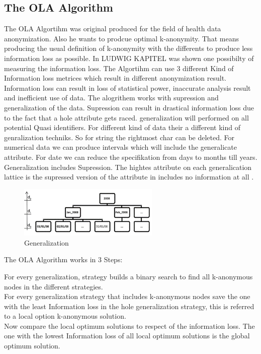\documentclass{llncs}
\begin{document}
\subsection{The OLA Algorithm }

The OLA Algortihm was original produced for the field of health data anonymization. Also he wants to prodcue optimal k-anonymity. That means producing the usual definition of k-anonymity with the differents to produce less information loss as possible. In LUDWIG KAPITEL was shown one possibilty of measuring the information loss. 
The Algortihm can use 3 different Kind of Information loss metrices which result in different anonymization result. Information loss can result in loss of statistical power, inaccurate analysis result and inefficient use of data.  
The alogrithem works with supression and generalization of the data. Supression can result in drastical information loss due to the fact that a hole attribute gets raced.  generalization will performed on all potential Quasi identifiers.
 For different kind of data their a different kind of genralization techniks. So for string the rightmost char can be deleted. For numerical data we can produce intervals which will include the generalicate attribute. For date we can reduce the specifikation from days to months till years. Generalization includes Supression. The hightes attribute on each generalication lattice is the supressed version of the attribute in includes no information at all \cite{el2009globally}. 


\begin{figure}
	\centering
	\includegraphics[width=0.6\textwidth]{general1.png}
	\caption{Generalization}%
	\label{Generalization}
\end{figure}

\begin{algorithm}[H]
\caption{The OLA Algorithm works in 3 Steps:}
{
 For every generalization, strategy builds a binary search to find all k-anonymous nodes in the different strategies.\\
For every generalization strategy that includes k-anonymous nodes save the one with the least Information loss in the hole generalization strategy, this is referred to a local option k-anonymous solution.\\
Now compare the local optimum solutions to respect of the information loss. The one with the lowest Information loss of all local optimum solutions is the global optimum solution.\\
}
	
\end{algorithm}
\end{document}
